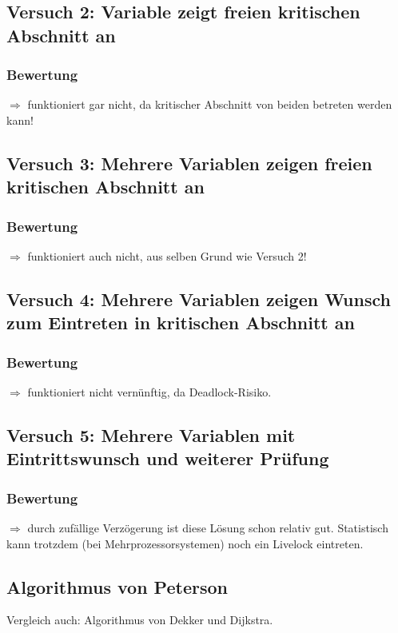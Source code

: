 \subsection{Versuch 2: Variable zeigt freien kritischen Abschnitt an}
\subsubsection*{Bewertung}
$\Rightarrow$ funktioniert gar nicht, da kritischer Abschnitt von beiden betreten werden kann!
\subsection{Versuch 3: Mehrere Variablen zeigen freien kritischen Abschnitt an}
\subsubsection*{Bewertung}
$\Rightarrow$ funktioniert auch nicht, aus selben Grund wie Versuch 2!
\subsection{Versuch 4: Mehrere Variablen zeigen Wunsch zum Eintreten in kritischen Abschnitt an}
\subsubsection*{Bewertung}
$\Rightarrow$ funktioniert nicht vernünftig, da Deadlock-Risiko.
\subsection{Versuch 5: Mehrere Variablen mit Eintrittswunsch und weiterer Prüfung}
\subsubsection*{Bewertung}
$\Rightarrow$ durch zufällige Verzögerung ist diese Lösung schon relativ gut. Statistisch kann trotzdem (bei Mehrprozessorsystemen) noch ein Livelock eintreten.
\subsection{Algorithmus von Peterson}
Vergleich auch: Algorithmus von Dekker und Dijkstra.
